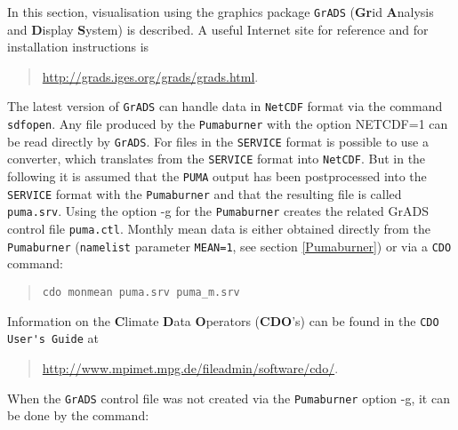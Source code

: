 In this section, visualisation using the graphics package \verb#GrADS#
({\bf Gr}id {\bf A}nalysis and {\bf D}isplay {\bf S}ystem) is
described. A useful Internet site for reference and for installation
instructions is
\begin{quote}
{\url{http://grads.iges.org/grads/grads.html}}.
\end{quote}
The latest version of \verb#GrADS# can handle data in \verb#NetCDF#
format via the command \verb#sdfopen#.
Any file produced by the \verb#Pumaburner# with the option NETCDF=1
can be read directly by \verb#GrADS#.
For files in the \verb#SERVICE# format is possible to use
a converter, which translates from the \verb#SERVICE# format into \verb#NetCDF#.
But in the following it is assumed that the \verb/PUMA/ output has been
postprocessed into the \verb#SERVICE# format with the \verb#Pumaburner# and that the
resulting file is called \verb/puma.srv/. Using the option -g for the \verb#Pumaburner# 
creates the related GrADS control file \verb/puma.ctl/.
Monthly mean data is either obtained
directly from the \verb#Pumaburner# (\verb#namelist# parameter
\verb#MEAN=1#, see section \ref{Pumaburner}) or via a
\verb/CDO/ command:
\begin{quote}
\verb/cdo monmean puma.srv puma_m.srv/
\end{quote}
\noindent Information on the {\bf C}limate {\bf D}ata {\bf O}perators ({\bf CDO}'s)
can be found in the \verb#CDO User's Guide# at
\begin{quote}
 {\url{http://www.mpimet.mpg.de/fileadmin/software/cdo/}}.
\end{quote}
When the \verb#GrADS# control file was not created via the \verb#Pumaburner# 
option -g, it can be done by the command:

